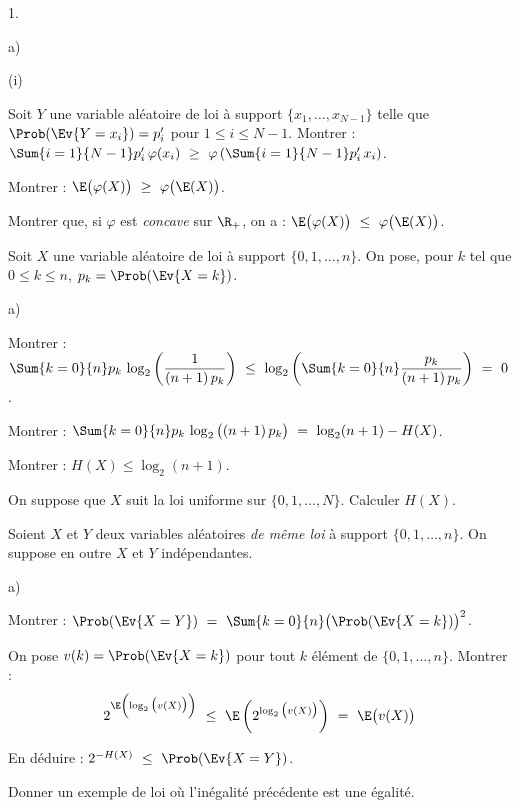 \documentclass[11pt]{article}%
\begin{document}
\begin{noliste}{1.}
\begin{noliste}{a)}
\begin{nonoliste}{(i)}
    \item Soit $Y$ une variable aléatoire de loi à support $\{x_1,
      \ldots, x_{N-1}\}$ telle que $\Prob(\Ev{Y = x_i}) = p_i'$ pour
      $1 \leq i \leq N-1$. Montrer : $\Sum{i=1}{N-1} p_i' \,
      \varphi(x_i) \ \geq \ \varphi\left( \Sum{i=1}{N-1} p_i' \, x_i
      \right)$.
      
    \item Montrer : $\E\big( \varphi(X) \big) \ \geq \ \varphi\big( \E(X)
      \big)$.
    \end{nonoliste}
    
  \item Montrer que, si $\varphi$ est {\it concave} sur $\R_+$, on a :
    $\E\big( \varphi(X)\big) \ \leq \ \varphi\big( \E(X) \big)$.
  \end{noliste}
  
\item Soit $X$ une variable aléatoire de loi à support $\{0,1, \ldots,
  n\}$. On pose, pour $k$ tel que $0 \leq k \leq n$, $p_k =
  \Prob(\Ev{X = k})$.
  \begin{noliste}{a)}
    \setlength{\itemsep}{2mm}
  \item Montrer : $\Sum{k=0}{n} p_k \, \log_2\left( \dfrac{1}{(n+1) \,
        p_k} \right) \ \leq \ \log_2\left( \Sum{k=0}{n}
      \dfrac{p_k}{(n+1) \, p_k}\right) \ = \ 0$.
    
  \item Montrer : $\Sum{k=0}{n} p_k \, \log_2 \big( (n+1) \, p_k \big)
    \ = \ \log_2(n+1) - H(X)$.
    
  \item Montrer : $H(X) \leq \log_2(n+1)$.
    
  \item On suppose que $X$ suit la loi uniforme sur $\{0,1, \ldots,
    N\}$. Calculer $H(X)$.
  \end{noliste}
  
\item Soient $X$ et $Y$ deux variables aléatoires {\it de même loi} à
  support $\{0,1, \ldots, n\}$. On suppose en outre $X$ et $Y$
  indépendantes.
  \begin{noliste}{a)}
    \setlength{\itemsep}{2mm}
  \item Montrer : $\Prob(\Ev{X = Y}) \ = \ \Sum{k=0}{n} \big(
    \Prob(\Ev{X = k})\big)^2$.
    
  \item On pose $v(k) = \Prob(\Ev{X = k})$ pour tout $k$ élément de
    $\{0,1, \ldots, n\}$. Montrer :
    \[
      2^{\E\left( \log_2\big(v(X)\big)\right)} \ \leq \ \E\left(
      2^{\log_2 \big(v(X)\big)}\right) \ = \ \E\big(v(X)\big)
    \]
      
  \item En déduire : $2^{-H(X)} \ \leq \ \Prob(\Ev{X = Y})$.
    
  \item Donner un exemple de loi où l'inégalité précédente est une
    égalité.
  \end{noliste}
\end{noliste}
\end{document}
